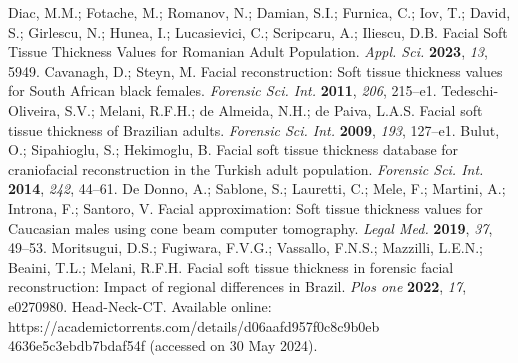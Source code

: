 \documentclass[journal,article,submit,pdftex,moreauthors]{Definitions/mdpi}
\begin{document}
\begin{thebibliography}{999}
Diac, M.M.; Fotache, M.; Romanov, N.; Damian, S.I.; Furnica, C.; Iov, T.; David, S.; Girlescu, N.; Hunea, I.; Lucasievici, C.; Scripcaru, A.; Iliescu, D.B. Facial Soft Tissue Thickness Values for Romanian Adult Population. {\em Appl. Sci.} {\bf 2023}, {\em 13}, 5949.
Cavanagh, D.; Steyn, M. Facial reconstruction: Soft tissue thickness values for South African black females. {\em Forensic Sci. Int.} {\bf 2011}, {\em 206}, 215--e1.
Tedeschi-Oliveira, S.V.; Melani, R.F.H.; de Almeida, N.H.; de Paiva, L.A.S. Facial soft tissue thickness of Brazilian adults. {\em Forensic Sci. Int.} {\bf 2009}, {\em 193}, 127--e1.
Bulut, O.; Sipahioglu, S.; Hekimoglu, B. Facial soft tissue thickness database for craniofacial reconstruction in the Turkish adult population. {\em Forensic Sci. Int.} {\bf 2014}, {\em 242}, 44--61.
De Donno, A.; Sablone, S.; Lauretti, C.; Mele, F.; Martini, A.; Introna, F.; Santoro, V. Facial approximation: Soft tissue thickness values for Caucasian males using cone beam computer tomography. {\em Legal Med.} {\bf 2019}, {\em 37}, 49--53.
Moritsugui, D.S.; Fugiwara, F.V.G.; Vassallo, F.N.S.; Mazzilli, L.E.N.; Beaini, T.L.; Melani, R.F.H. Facial soft tissue thickness in forensic facial reconstruction: Impact of regional differences in Brazil. {\em Plos one} {\bf 2022}, {\em 17}, e0270980.
Head-Neck-CT. Available online: https://academictorrents.com/details/d06aafd957f0c8c9b0eb 4636e5c3ebdb7bdaf54f (accessed on 30 May 2024).
\end{thebibliography}
\end{document}
